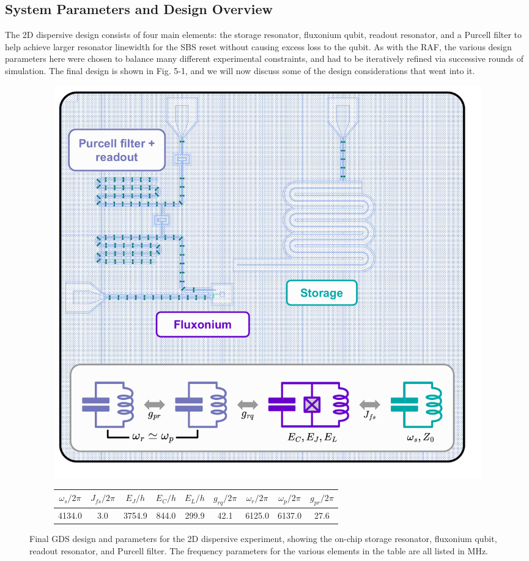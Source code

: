 \subsection{System Parameters and Design Overview}
The 2D dispersive design consists of four main elements: the storage resonator, fluxonium qubit, readout resonator, and a Purcell filter to help achieve larger resonator linewidth for the SBS reset without causing excess loss to the qubit. As with the RAF, the various design parameters here were chosen to balance many different experimental constraints, and had to be iteratively refined via successive rounds of simulation. The final design is shown in Fig. 5-1, and we will now discuss some of the design considerations that went into it.
\begin{figure}[h] 
    \begin{subfigure}{\linewidth}
        \centering
        \includegraphics[width=0.8\linewidth]{Figures/5/2D_Dispersive_GDS.pdf}
        \vspace*{2mm}
    \end{subfigure} 
    \begin{subfigure}{\linewidth}
        \centering
        \begin{tabular}{c|c|c|c|c|c|c|c|c }
       $\omega_s/2\pi$ & $J_{fs}/2\pi$ & $E_J/h$  & $E_C/h$ & $E_L/h$ & $g_{rq}/2\pi$ & $\omega_r/2\pi$ & $\omega_p/2\pi$ & $g_{pr}/2\pi$\\\hline
        4134.0 & 3.0 & 3754.9 & 844.0 & 299.9 & 42.1 & 6125.0 & 6137.0 & 27.6
    \end{tabular}
    \end{subfigure}
    \caption[Design and parameters for 2D dispersive experiment.]{Final GDS design and parameters for the 2D dispersive experiment, showing the on-chip storage resonator, fluxonium qubit, readout resonator, and Purcell filter. The frequency parameters for the various elements in the table are all listed in MHz.}
    \label{fig:5_2D_Dispersive_GDS}
\end{figure}

